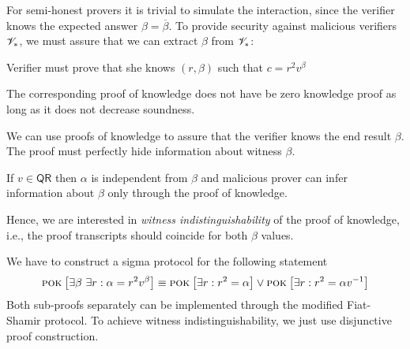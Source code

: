 \documentclass[landscape,footrule]{foils}
\begin{document}



For semi-honest provers it is trivial to simulate the interaction,
since the verifier knows the expected answer
$\beta=\overline{\beta}$. To provide security against malicious
verifiers $\mathscr{V}_*$, we must assure that we can extract
$\beta$ from $\mathscr{V}_*$:
\begin{triangles}
  \item Verifier must prove that she knows $(r,\beta)$ such that $c=r^2v^{\beta}$ 
  \item The corresponding proof of knowledge does not have be zero
    knowledge proof as long as it does not decrease soundness.
\end{triangles}



We can use proofs of knowledge to assure that the verifier knows the
end result $\beta$. The proof must perfectly hide  information about witness
$\beta$.
\begin{triangles}
\item If $v\in\mathsf{QR}$ then $\alpha$ is independent from $\beta$
  and malicious prover can infer information about $\beta$ only
  through the proof of knowledge.
\item Hence, we are interested in \emph{witness indistinguishability}
  of the proof of knowledge, i.e., the proof transcripts should
  coincide for both $\beta$ values.
\end{triangles}


We have to construct a sigma protocol for the following statement
\begin{align*}
\textsc{pok}_{}\left[\exists \beta\ \exists r: \alpha=r^2v^\beta\right]\equiv
\textsc{pok}_{}\left[\exists r:r^2=\alpha\right]\vee \textsc{pok}_{}\left[\exists r:r^2=\alpha v^{-1}\right]  
\end{align*}
Both sub-proofs separately can be implemented through the modified
Fiat-Shamir protocol. To achieve witness indistinguishability, we just
use disjunctive proof construction.
\end{document}

